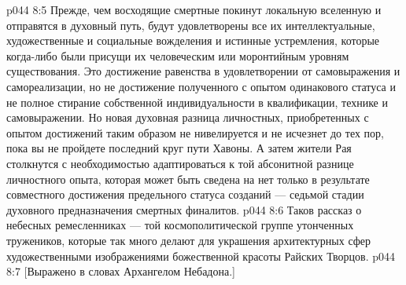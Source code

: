 \vs p044 8:5 Прежде, чем восходящие смертные покинут локальную вселенную и отправятся в духовный путь, будут удовлетворены все их интеллектуальные, художественные и социальные вожделения и истинные устремления, которые когда\hyp{}либо были присущи их человеческим или моронтийным уровням существования. Это достижение равенства в удовлетворении от самовыражения и самореализации, но не достижение полученного с опытом одинакового статуса и не полное стирание собственной индивидуальности в квалификации, технике и самовыражении. Но новая духовная разница личностных, приобретенных с опытом достижений таким образом не нивелируется и не исчезнет до тех пор, пока вы не пройдете последний круг пути Хавоны. А затем жители Рая столкнутся с необходимостью адаптироваться к той абсонитной разнице личностного опыта, которая может быть сведена на нет только в результате совместного достижения предельного статуса созданий --- седьмой стадии духовного предназначения смертных финалитов.
\vs p044 8:6 \pc Таков рассказ о небесных ремесленниках --- той космополитической группе утонченных тружеников, которые так много делают для украшения архитектурных сфер художественными изображениями божественной красоты Райских Творцов.
\vsetoff
\vs p044 8:7 [Выражено в словах Архангелом Небадона.]
